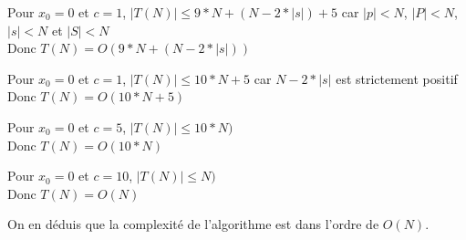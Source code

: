 \documentclass{report}
\begin{document}
Pour $x_0 = 0$ et $c = 1$, $|T(N)| \leq 9 * N + (N - 2 * |s|) + 5$ car $|p| < N$, $|P| < N$, $|s| < N$ et $|S| < N$ \\
Donc $T(N) = O(9 * N + (N - 2 * |s|))$

\vspace{5mm}

Pour $x_0 = 0$ et $c = 1$, $|T(N)| \leq 10 * N + 5$ car $N - 2 * |s|$ est strictement positif \\
Donc $T(N) = O(10 * N + 5)$

\vspace{5mm}

Pour $x_0 = 0$ et $c = 5$, $|T(N)| \leq 10 * N)$ \\
Donc $T(N) = O(10 * N)$

\vspace{5mm}

Pour $x_0 = 0$ et $c = 10$, $|T(N)| \leq N)$ \\
Donc $T(N) = O(N)$

\vspace{5mm}

On en déduis que la complexité de l'algorithme est dans l'ordre de $O(N)$.
\end{document}
